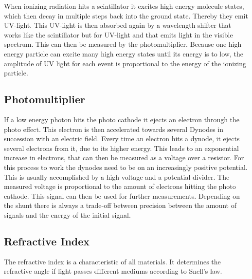 \documentclass[]{article}
\begin{document}
When ionizing radiation hits a scintillator it excites high energy molecule states, which then decay in multiple steps back into the ground state. Thereby they emit UV-light. This UV-light is then absorbed again by a wavelength shifter that works like the scintillator but for UV-light and that emits light in the visible spectrum. This can then be measured by the photomultiplier. Because one high energy particle can excite many high energy states until its energy is to low, the amplitude of UV light for each event is proportional to the energy of the ionizing particle.
\subsection{Photomultiplier}
If a low energy photon hits the photo cathode it ejects an electron through the photo effect. This electron is then accelerated towards several Dynodes in succession with an electric field. Every time an electron hits a dynode, it ejects several electrons from it, due to its higher energy. This leads to an exponential increase in electrons, that can then be measured as a voltage over a resistor. For this process to work the dynodes need to be on an increasingly positive potential. This is usually accomplished by a high voltage and a potential divider. 
The measured voltage is proportional to the amount of electrons hitting the photo cathode. This signal can then be used for further measurements. Depending on the shunt there is always a trade-off between precision between the amount of signals and the energy of the initial signal. 
\subsection{Refractive Index}\label{refrac index}
The refractive index is a characteristic of all materials. It determines the refractive angle if light passes different mediums according to Snell's law. 
\end{document}
